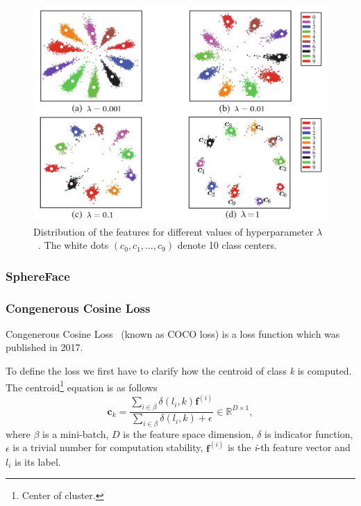 \begin{figure}[H]
    \centering
    \includegraphics[width=\columnwidth]{images/face-recognition/centerlosslambda.png}
    \caption{Distribution of the features for different values of hyperparameter $\lambda$~\cite{CenterLoss}.
    The white dots $(c_0,c_1,\dots,c_9)$ denote 10 class centers.}
    \label{fig:centerlosslambda}
\end{figure}


\subsubsection{SphereFace}

\subsubsection{Congenerous Cosine Loss}
Congenerous Cosine Loss~\cite{CocoLoss} (known as COCO loss) is a loss function which was published in 2017.

To define the loss we first have to clarify how the centroid of class \textit{k} is computed.
The centroid\footnote{Center of cluster.} equation is as follows
\begin{equation}
    \boldsymbol{c}_{k} = \frac{\sum_{i \in \beta} \delta \left( l_i, k \right)\boldsymbol{f}^{(i)}}
    {\sum_{i \in \beta} \delta \left( l_i, k \right) + \epsilon} \in \mathbb{R}^{D \times 1},
\end{equation}
where $\beta$ is a mini-batch, $D$ is the feature space dimension, $\delta$ is indicator function, $\epsilon$ is a
trivial number for computation stability, $\boldsymbol{f}^{(i)}$ is the \textit{i}-th feature vector and $l_i$ is
its label.

